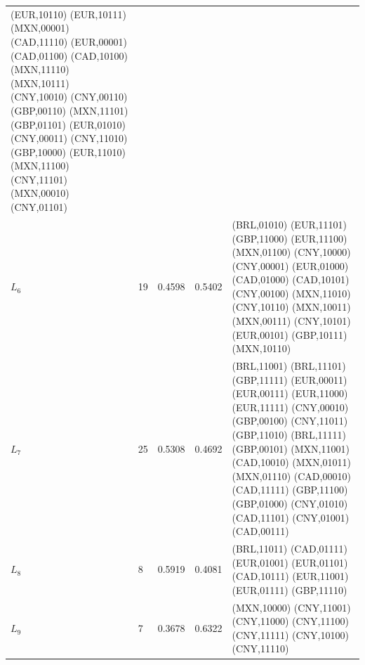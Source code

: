 \begin{tabular}{lllll}
\begin{minipage}[t]{0.55\textwidth}
  (EUR,10110) (EUR,10111) (MXN,00001) (CAD,11110) (EUR,00001)
  (CAD,01100) (CAD,10100) (MXN,11110) (MXN,10111) (CNY,10010)
  (CNY,00110) (GBP,00110) (MXN,11101) (GBP,01101) (EUR,01010)
  (CNY,00011) (CNY,11010) (GBP,10000) (EUR,11010) (MXN,11100)
  (CNY,11101) (MXN,00010) (CNY,01101)
  \end{minipage} \\[2pt]
$L_{6}$ & 19 & 0.4598 & 0.5402 &
  \begin{minipage}[t]{0.55\textwidth}\raggedright\scriptsize
  (BRL,01010) (EUR,11101) (GBP,11000) (EUR,11100) (MXN,01100)
  (CNY,10000) (CNY,00001) (EUR,01000) (CAD,01000) (CAD,10101)
  (CNY,00100) (MXN,11010) (CNY,10110) (MXN,10011) (MXN,00111)
  (CNY,10101) (EUR,00101) (GBP,10111) (MXN,10110)
  \end{minipage} \\[2pt]
$L_{7}$ & 25 & 0.5308 & 0.4692 &
  \begin{minipage}[t]{0.55\textwidth}\raggedright\scriptsize
  (BRL,11001) (BRL,11101) (GBP,11111) (EUR,00011) (EUR,00111)
  (EUR,11000) (EUR,11111) (CNY,00010) (GBP,00100) (CNY,11011)
  (GBP,11010) (BRL,11111) (GBP,00101) (MXN,11001) (CAD,10010)
  (MXN,01011) (MXN,01110) (CAD,00010) (CAD,11111) (GBP,11100)
  (GBP,01000) (CNY,01010) (CAD,11101) (CNY,01001) (CAD,00111)
  \end{minipage} \\[2pt]
$L_{8}$ & 8 & 0.5919 & 0.4081 &
  \begin{minipage}[t]{0.55\textwidth}\raggedright\scriptsize
  (BRL,11011) (CAD,01111) (EUR,01001) (EUR,01101) (CAD,10111)
  (EUR,11001) (EUR,01111) (GBP,11110)
  \end{minipage} \\[2pt]
$L_{9}$ & 7 & 0.3678 & 0.6322 &
  \begin{minipage}[t]{0.55\textwidth}\raggedright\scriptsize
  (MXN,10000) (CNY,11001) (CNY,11000) (CNY,11100) (CNY,11111)
  (CNY,10100) (CNY,11110)
  \end{minipage} \\
\bottomrule
\end{tabular}
